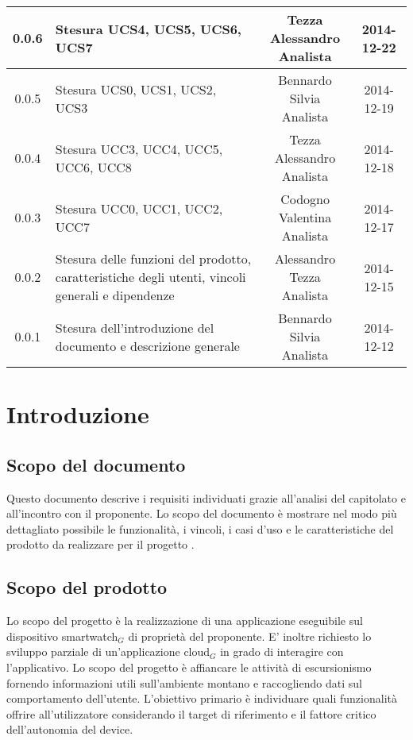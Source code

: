 \begin{center}
\begin{tabularx}{\textwidth}{cXcc}
0.0.6 & Stesura UCS4, UCS5, UCS6, UCS7 & \multicell{Tezza Alessandro \\ Analista} & 2014-12-22 \\\midrule
0.0.5 & Stesura UCS0, UCS1, UCS2, UCS3 & \multicell{Bennardo Silvia \\ Analista} & 2014-12-19 \\\midrule
0.0.4 & Stesura UCC3, UCC4, UCC5, UCC6, UCC8 & \multicell{Tezza Alessandro \\ Analista} & 2014-12-18 \\\midrule
0.0.3 & Stesura UCC0, UCC1, UCC2, UCC7 & \multicell{Codogno Valentina \\ Analista} & 2014-12-17 \\\midrule
0.0.2 & Stesura delle funzioni del prodotto, caratteristiche degli utenti, vincoli generali e dipendenze & \multicell{Alessandro Tezza \\ Analista} & 2014-12-15 \\\midrule
0.0.1 & Stesura dell'introduzione del documento e descrizione generale & \multicell{Bennardo Silvia \\ Analista} & 2014-12-12 \\



\bottomrule
\end{tabularx}
\end{center}
\newpage



\section{Introduzione}
\subsection{Scopo del documento}
Questo documento descrive i requisiti individuati grazie all'analisi del capitolato e all'incontro con il proponente. Lo scopo del documento è mostrare nel modo più dettagliato possibile le funzionalità, i vincoli, i casi d'uso e le caratteristiche del prodotto da realizzare per il progetto \CAPITOLATO{}.

\subsection{Scopo del prodotto}
Lo scopo del progetto è la realizzazione di una applicazione eseguibile sul dispositivo smartwatch$_{G}$ di proprietà del proponente. E’ inoltre richiesto lo sviluppo parziale di un’applicazione cloud$_{G}$ in grado di interagire con l’applicativo. Lo scopo del progetto è affiancare le attività di escursionismo fornendo informazioni utili sull’ambiente montano e raccogliendo dati sul comportamento dell’utente. L’obiettivo primario è individuare quali funzionalità offrire all’utilizzatore considerando il target di riferimento e il fattore critico dell’autonomia del device.

